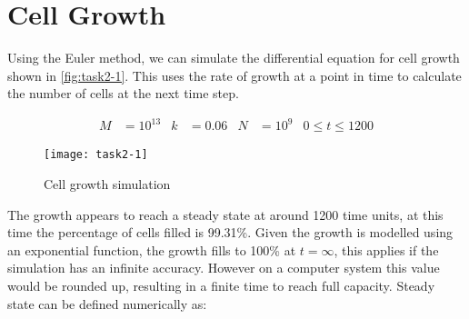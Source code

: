 \section{Cell Growth}











Using the Euler method, we can simulate the differential equation for cell growth shown in \autoref{fig:task2-1}.
This uses the rate of growth at a point in time to calculate the number of cells at the next time step.

\setlength{\belowdisplayskip}{0pt} \setlength{\belowdisplayshortskip}{0pt}
\setlength{\abovedisplayskip}{0pt} \setlength{\abovedisplayshortskip}{0pt}

\begin{align*}
    M &= 10^{13} & k &= 0.06 & N &= 10^9 & 0 \leq t \leq 1200
\end{align*}

\begin{figure}[ht]
    \centering
    \texttt{[image: task2-1]}
    \caption[Cell growth simulation]{Cell growth simulation}
    \label{fig:task2-1}
\end{figure}

The growth appears to reach a steady state at around 1200 time units, at this time the percentage of cells filled is 99.31\%.
Given the growth is modelled using an exponential function, the growth fills to 100\% at $t = \infty$,
this applies if the simulation has an infinite accuracy.
However on a computer system this value would be rounded up, resulting in a finite time to reach full capacity.
Steady state can be defined numerically as:

